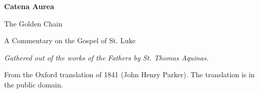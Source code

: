 \documentclass[11pt,letterpaper]{article}
\begin{document}
\color{ink}

\begin{titlepage}
\centering
\vspace*{4em}
{\LARGE\bfseries\color{heading} Catena Aurea\par}
\vspace{1em}
{\large The Golden Chain\par}
\vspace{2em}
{\Large\color{subhead} A Commentary on the Gospel of St. Luke\par}
\vspace{2.5em}
{\itshape\color{subhead} Gathered out of the works of the Fathers by
St. Thomas Aquinas.\par}
\vfill
{\small From the Oxford translation of 1841 (John Henry Parker). The
translation is in the public domain.\par}
\vspace{2em}
\end{titlepage}

\tableofcontents


\end{document}
